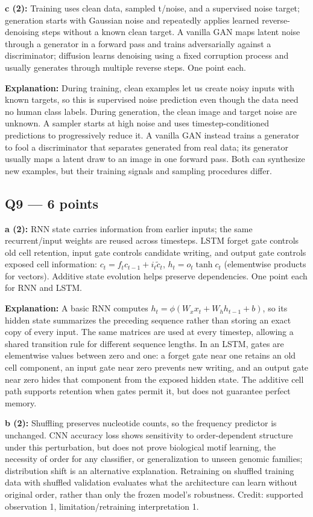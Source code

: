 \documentclass[11pt]{article}
\begin{document}
\textbf{c (2):} Training uses clean data, sampled t/\allowbreak{}noise, and a supervised noise target; generation starts with Gaussian noise and repeatedly applies learned reverse-denoising steps without a known clean target. A vanilla GAN maps latent noise through a generator in a forward pass and trains adversarially against a discriminator; diffusion learns denoising using a fixed corruption process and usually generates through multiple reverse steps. One point each.

\textbf{Explanation:} During training, clean examples let us create noisy inputs with known targets, so this is supervised noise prediction even though the data need no human class labels. During generation, the clean image and target noise are unknown. A sampler starts at high noise and uses timestep-conditioned predictions to progressively reduce it. A vanilla GAN instead trains a generator to fool a discriminator that separates generated from real data; its generator usually maps a latent draw to an image in one forward pass. Both can synthesize new examples, but their training signals and sampling procedures differ.


\subsection*{Q9 — 6 points}

\textbf{a (2):} RNN state carries information from earlier inputs; the same recurrent/\allowbreak{}input weights are reused across timesteps. LSTM forget gate controls old cell retention, input gate controls candidate writing, and output gate controls exposed cell information: $c_t=f_tc_{t-1}+i_t\tilde c_t$, $h_t=o_t\tanh c_t$ (elementwise products for vectors). Additive state evolution helps preserve dependencies. One point each for RNN and LSTM.

\textbf{Explanation:} A basic RNN computes $h_t=\phi(W_xx_t+W_hh_{t-1}+b)$, so its hidden state summarizes the preceding sequence rather than storing an exact copy of every input. The same matrices are used at every timestep, allowing a shared transition rule for different sequence lengths. In an LSTM, gates are elementwise values between zero and one: a forget gate near one retains an old cell component, an input gate near zero prevents new writing, and an output gate near zero hides that component from the exposed hidden state. The additive cell path supports retention when gates permit it, but does not guarantee perfect memory.

\textbf{b (2):} Shuffling preserves nucleotide counts, so the frequency predictor is unchanged. CNN accuracy loss shows sensitivity to order-dependent structure under this perturbation, but does not prove biological motif learning, the necessity of order for any classifier, or generalization to unseen genomic families; distribution shift is an alternative explanation. Retraining on shuffled training data with shuffled validation evaluates what the architecture can learn without original order, rather than only the frozen model's robustness. Credit: supported observation 1, limitation/\allowbreak{}retraining interpretation 1.
\end{document}
